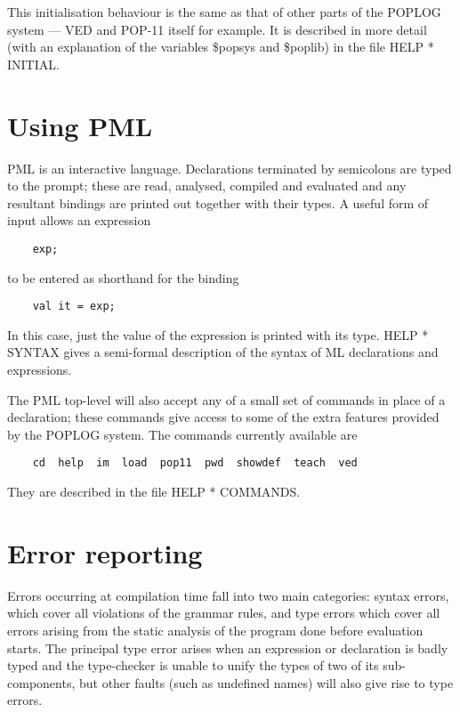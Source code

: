 This initialisation behaviour is the same as that of other parts of the
POPLOG system --- VED and POP-11 itself for example. It is described in
more detail (with an explanation of the variables \$popsys and \$poplib)
in the file HELP * INITIAL.


\section{Using PML}                                                          

PML is an interactive language. Declarations terminated by semicolons
are typed to the prompt; these are read, analysed, compiled and
evaluated and any resultant bindings are printed out together with their
types. A useful form of input allows an expression
\begin{verbatim}
    exp;
\end{verbatim}

to be entered as shorthand for the binding
\begin{verbatim}
    val it = exp;
\end{verbatim}

In this case, just the value of the expression is printed with its type.
HELP * SYNTAX gives a semi-formal description of the syntax of ML
declarations and expressions.

The PML top-level will also accept any of a small set of commands in
place of a declaration; these commands give access to some of the extra
features provided by the POPLOG system. The commands currently available
are
\begin{verbatim}
    cd  help  im  load  pop11  pwd  showdef  teach  ved
\end{verbatim}

They are described in the file HELP * COMMANDS.


\section{Error reporting}

Errors occurring at compilation time fall into two main categories:
syntax errors, which cover all violations of the grammar rules, and type
errors which cover all errors arising from the static analysis of the
program done before evaluation starts. The principal type error arises
when an expression or declaration is badly typed and the type-checker is
unable to unify the types of two of its sub-components, but other faults
(such as undefined names) will also give rise to type errors.

